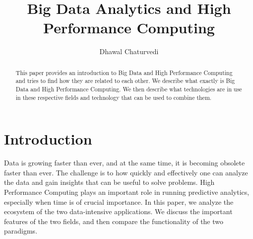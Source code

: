 \documentclass[sigconf]{acmart}
\begin{document}
\title{Big Data Analytics and High Performance Computing}

\author{Dhawal Chaturvedi}


\renewcommand{\shortauthors}{D.Chaturvedi}


\begin{abstract}
This paper provides an introduction to Big Data and High Performance Computing and tries to find how they are related to each other. We describe what exactly is Big Data and High Performance Computing. We then describe what technologies are in use in these respective fields and technology that can be used to combine them.
\end{abstract}



\maketitle

\section{Introduction}
Data is growing faster than ever, and at the same time, it is becoming obsolete faster than ever. The challenge is to how quickly and effectively one can analyze the data and gain insights that can be useful to solve problems. High Performance Computing plays an important role in running predictive analytics, especially when time is of crucial importance. In this paper, we analyze the ecosystem of the two data-intensive applications. We discuss the important features of the two fields, and then compare the functionality of the two paradigms.
\end{document}
